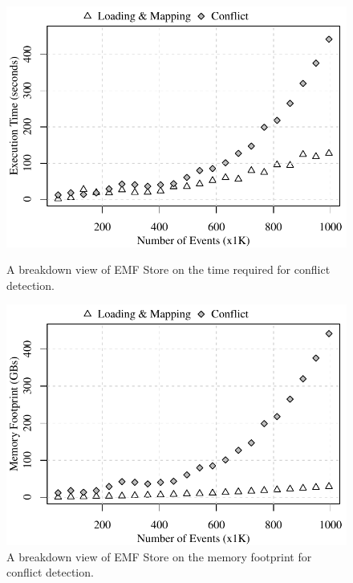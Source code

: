 \begin{figure}[]
  \begin{minipage}[b]{0.490\textwidth}
    \includegraphics[width=\linewidth]{emfs-conflict-time-events}
    \caption{A breakdown view of EMF Store on the time required for conflict detection.}
    \label{fig:emfs-conflict-time-events}
  \end{minipage}
  \hfill
  \begin{minipage}[b]{0.490\textwidth}
    \includegraphics[width=\linewidth]{emfs-conflict-memory-events}
    \caption{A breakdown view of EMF Store on the memory footprint for conflict detection.}
    \label{fig:emfs-conflict-memory-events}
  \end{minipage}
\end{figure}

